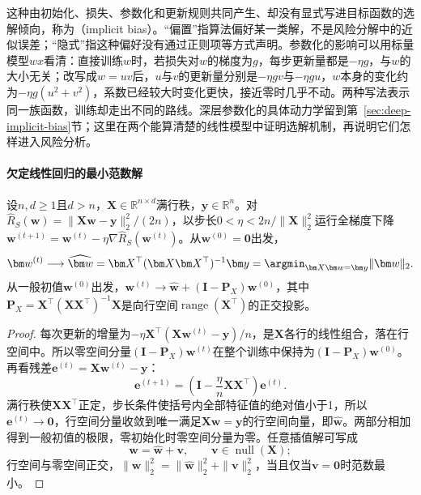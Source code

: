 这种由初始化、损失、参数化和更新规则共同产生、却没有显式写进目标函数的选解倾向，称为（implicit bias）。“偏置”指算法偏好某一类解，不是风险分解中的近似误差；“隐式”指这种偏好没有通过正则项等方式声明。参数化的影响可以用标量模型$wx$看清：直接训练$w$时，若损失对$w$的梯度为$g$，每步更新量都是$-\eta g$，与$w$的大小无关；改写成$w=uv$后，$u$与$v$的更新量分别是$-\eta gv$与$-\eta gu$，$w$本身的变化约为$-\eta g(u^2+v^2)$，系数已经较大时变化更快，接近零时几乎不动。两种写法表示同一族函数，训练却走出不同的路线。深层参数化的具体动力学留到第~\ref{sec:deep-implicit-bias}节；这里在两个能算清楚的线性模型中证明选解机制，再说明它们怎样进入风险分析。

\paragraph{欠定线性回归的最小范数解}

\begin{theorem}[梯度下降的最小范数选择]
\label{thm:min-norm-interpolation}
\label{thm:learning-gradient-descent-minimum-norm}
设$n,d\geq1$且$d>n$，$\bm X\in\mathbb R^{n\times d}$满行秩，$\bm y\in\mathbb R^n$。对$\hat R_S(\bm w)=\|\bm X\bm w-\bm y\|_2^2/(2n)$，以步长$0<\eta<2n/\|\bm X\|_2^2$运行全梯度下降$\bm w^{(t+1)}=\bm w^{(t)}-\eta\nabla\hat R_S(\bm w^{(t)})$。从$\bm w^{(0)}=\bm 0$出发，
\begin{equation}
 \bm w^{(t)}\longrightarrow\widehat{\bm w}
 =\bm X^\top(\bm X\bm X^\top)^{-1}\bm y
 =\argmin_{\bm X\bm w=\bm y}\|\bm w\|_2.
 \label{eq:learning-minimum-norm-interpolator}
\end{equation}
从一般初值$\bm w^{(0)}$出发，$\bm w^{(t)}\to\widehat{\bm w}+(\bm I-\bm P_X)\bm w^{(0)}$，其中$\bm P_X=\bm X^\top(\bm X\bm X^\top)^{-1}\bm X$是向行空间$\operatorname{range}(\bm X^\top)$的正交投影。
\end{theorem}
\begin{proof}
每次更新的增量为$-\eta\bm X^\top(\bm X\bm w^{(t)}-\bm y)/n$，是$\bm X$各行的线性组合，落在行空间中。所以零空间分量$(\bm I-\bm P_X)\bm w^{(t)}$在整个训练中保持为$(\bm I-\bm P_X)\bm w^{(0)}$。再看残差$\bm e^{(t)}=\bm X\bm w^{(t)}-\bm y$：
\[
 \bm e^{(t+1)}=\left(\bm I-\frac\eta n\bm X\bm X^\top\right)\bm e^{(t)}.
\]
满行秩使$\bm X\bm X^\top$正定，步长条件使括号内全部特征值的绝对值小于1，所以$\bm e^{(t)}\to\bm 0$，行空间分量收敛到唯一满足$\bm X\bm w=\bm y$的行空间向量，即$\widehat{\bm w}$。两部分相加得到一般初值的极限，零初始化时零空间分量为零。任意插值解可写成
\begin{equation}
 \bm w=\widehat{\bm w}+\bm v,\qquad\bm v\in\operatorname{null}(\bm X);
 \label{eq:learning-interpolator-decomposition}
\end{equation}
行空间与零空间正交，$\|\bm w\|_2^2=\|\widehat{\bm w}\|_2^2+\|\bm v\|_2^2$，当且仅当$\bm v=\bm 0$时范数最小。
\end{proof}

